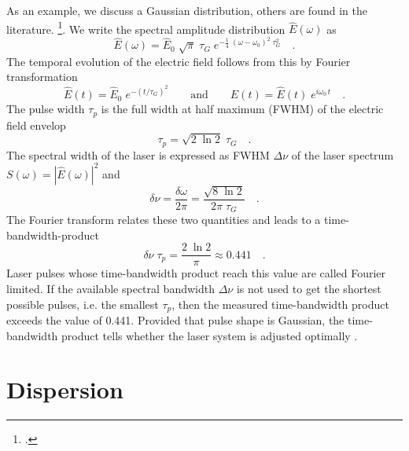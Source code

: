 As an example, we discuss a Gaussian distribution, others are found in the literature. \footcite{DielsRudolph1996,Rulliere2005}.
We write the spectral amplitude distribution $\hat{E}(\omega)$ as
\begin{equation}
  \hat{E}(\omega) = \hat{E}_0 \; \sqrt{\pi} \; \tau_G \; e^{-
  \frac{1}{4} \; (\omega - \omega_0)^2 \; \tau_G^2} \quad .
\end{equation}
The temporal evolution of the electric field follows from this by
Fourier transformation
\begin{equation}
  \hat {E}(t) = \hat{E}_0 \; e^{- ( t / \tau_G ) ^2}
  \qquad\text{and}\qquad E(t) = \hat{E}(t)\; e^{i \omega_0 \, t} \quad .
\end{equation}
The pulse width $\tau_p$ is the full width at half maximum (FWHM) of the electric field envelop
\begin{equation}
  \tau_p = \sqrt{2 \; \ln 2} \; \tau_G \quad.
\end{equation}
The spectral width of the laser is expressed as FWHM $\Delta
\nu$ of the laser spectrum $S(\omega) =
|\hat{E}(\omega)|^2$ and
\begin{equation}
  \delta \nu = \frac{\delta \omega}{2 \pi} = \frac{\sqrt{8 \; \ln
  2}}{2 \pi \; \tau_G} \quad.
\end{equation}
The Fourier transform relates these two quantities and leads to a time-bandwidth-product
\begin{equation}
  \delta \nu \; \tau_p = \frac{2 \; \ln 2}{\pi} \approx 0.441 \quad .
\end{equation}
Laser pulses whose time-bandwidth product reach this value
are called Fourier limited. If the available
 spectral bandwidth $\Delta \nu$ is not used
to get the shortest possible pulses, i.e. the smallest $\tau_p$,
then the measured time-bandwidth product exceeds the
value of 0.441. Provided that pulse shape is Gaussian, the time-bandwidth product tells whether the 
laser system is adjusted optimally .

\section{Dispersion}

